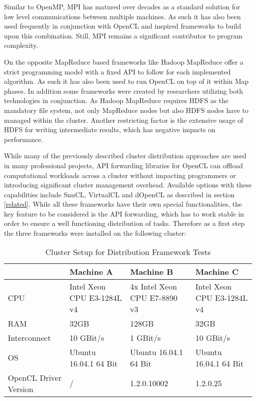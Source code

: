 Similar to OpenMP, MPI has matured over decades as a standard solution for low level communications between multiple machines. As such it has also been used frequently in conjunction with OpenCL and inspired frameworks to build upon this combination. Still, MPI remains a significant contributor to program complexity.

On the opposite MapReduce based frameworks like Hadoop MapReduce offer a strict programming model with a fixed API to follow for each implemented algorithm. As such it has also been used to run OpenCL on top of it within Map phases. In addition some frameworks were created by researchers utilizing both technologies in conjunction. As Hadoop MapReduce requires HDFS as the mandatory file system, not only MapReduce nodes but also HDFS nodes have to managed within the cluster. Another restricting factor is the extensive usage of HDFS for writing intermediate results, which has negative impacts on performance.

While many of the previously described cluster distribution approaches are used in many professional projects, API forwarding libraries for OpenCL can offload computational workloads across a cluster without impacting programmers or introducing significant cluster management overhead. Available options with these capabilities include SnuCL, VirtualCL and dOpenCL as described in section \ref{related}. While all these frameworks have their own special functionalities, the key feature to be considered is the API forwarding, which has to work stable in order to ensure a well functioning distribution of tasks. Therefore as a first step the three frameworks were installed on the following cluster:

\begin{table}[htb]
  \centering
    \begin{adjustbox}{width=1\textwidth}
    \small
    \begin{tabular}{l | l | l | l}
    ~                     & Machine A                   & Machine B                  	& Machine C                  \\
    \hline
    CPU                   & Intel Xeon CPU E3-1284L v4 	& 4x Intel Xeon CPU E7-8890 v3 	& Intel Xeon CPU E3-1284L v4 \\
    RAM                   & 32GB                        & 128GB                       	& 32GB                       \\
    Interconnect          & 10 GBit/s                   & 1 GBit/s                  	& 10 GBit/s                  \\
    OS                    & Ubuntu 16.04.1 64 Bit       & Ubuntu 16.04.1 64 Bit      	& Ubuntu 16.04.1 64 Bit      \\
    OpenCL Driver Version & /                 			& 1.2.0.10002                   & 1.2.0.25                   \\
    \end{tabular}
    \end{adjustbox}

    \caption{Cluster Setup for Distribution Framework Tests}
    \label{table:cluster_setup_1}
\end{table}

